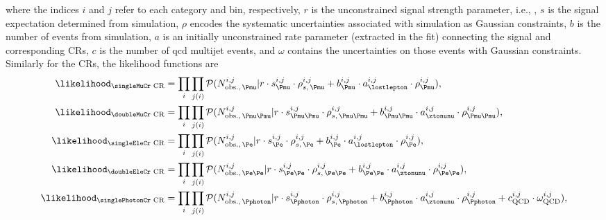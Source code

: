 where the indices $i$ and $j$ refer to each category and \ptmiss bin, respectively, $r$ is the unconstrained signal strength parameter, i.e., \BRHinvFull, $s$ is the signal expectation determined from simulation, $\rho$ encodes the systematic uncertainties associated with simulation as Gaussian constraints, $b$ is the number of events from simulation, $a$ is an initially unconstrained rate parameter (extracted in the fit) connecting the signal and corresponding \glspl{CR}, $c$ is the number of \acrshort{qcd} multijet events, and $\omega$ contains the uncertainties on those events with Gaussian constraints. Similarly for the \glspl{CR}, the likelihood functions are
\begin{equation}
    \begin{aligned}
\likelihood_{\text{\singleMuCr CR}} &= \prod_{i} \prod_{j(i)} \mathcal{P}( N_{\mathrm{obs.}, \, \Pmu }^{i, j} | r \cdot s^{i, j}_{\Pmu} \cdot \rho_{s,\, \Pmu}^{i, j} + b_{\Pmu}^{i, j} \cdot a_{\lostlepton}^{i, j} \cdot \rho_{\Pmu}^{i, j} ),\\
\likelihood_{\text{\doubleMuCr CR}} &= \prod_{i} \prod_{j(i)} \mathcal{P}( N_{\mathrm{obs.}, \, \Pmu\Pmu }^{i, j} | r \cdot s^{i, j}_{\Pmu\Pmu} \cdot \rho_{s,\, \Pmu\Pmu}^{i, j} + b_{\Pmu\Pmu}^{i, j} \cdot a_{\ztonunu}^{i, j} \cdot \rho_{\Pmu\Pmu}^{i, j} ),\\
\likelihood_{\text{\singleEleCr CR}} &= \prod_{i} \prod_{j(i)} \mathcal{P}( N_{\mathrm{obs.}, \, \Pe }^{i, j} | r \cdot s^{i, j}_{\Pe} \cdot \rho_{s,\, \Pe}^{i, j} + b_{\Pe}^{i, j} \cdot a_{\lostlepton}^{i, j} \cdot \rho_{\Pe}^{i, j} ),\\
\likelihood_{\text{\doubleEleCr CR}} &= \prod_{i} \prod_{j(i)} \mathcal{P}( N_{\mathrm{obs.}, \, \Pe\Pe }^{i, j} | r \cdot s^{i, j}_{\Pe\Pe} \cdot \rho_{s,\, \Pe\Pe}^{i, j} + b_{\Pe\Pe}^{i, j} \cdot a_{\ztonunu}^{i, j} \cdot \rho_{\Pe\Pe}^{i, j} ),\\
\likelihood_{\text{\singlePhotonCr CR}} &= \prod_{i} \prod_{j(i)} \mathcal{P}( N_{\mathrm{obs.}, \, \Pphoton }^{i, j} | r \cdot s^{i, j}_{\Pphoton} \cdot \rho_{s,\, \Pphoton}^{i, j} + b_{\Pphoton}^{i, j} \cdot a_{\ztonunu}^{i, j} \cdot \rho_{\Pphoton}^{i, j} + c_{\mathrm{QCD}}^{i, j} \cdot \omega_{\mathrm{QCD}}^{i, j} ),
    \end{aligned}
    \label{eq:likelihood_CRs}
\end{equation}
